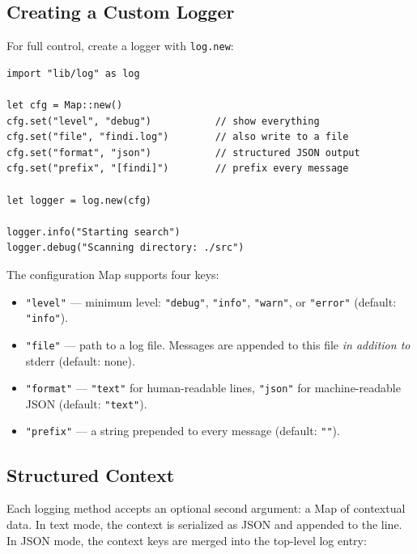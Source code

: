 \subsection{Creating a Custom Logger}\label{sec:log-custom-logger}


For full control, create a logger with \lstinline|log.new|:

\begin{lstlisting}[language=Lattice, caption={Creating a custom logger}]
import "lib/log" as log

let cfg = Map::new()
cfg.set("level", "debug")           // show everything
cfg.set("file", "findi.log")        // also write to a file
cfg.set("format", "json")           // structured JSON output
cfg.set("prefix", "[findi]")        // prefix every message

let logger = log.new(cfg)

logger.info("Starting search")
logger.debug("Scanning directory: ./src")
\end{lstlisting}

The configuration Map supports four keys:

\begin{itemize}
  \item \lstinline|"level"| --- minimum level: \lstinline|"debug"|, \lstinline|"info"|, \lstinline|"warn"|, or \lstinline|"error"| (default: \lstinline|"info"|).
  \item \lstinline|"file"| --- path to a log file. Messages are appended to this file \emph{in addition to} stderr (default: none).
  \item \lstinline|"format"| --- \lstinline|"text"| for human-readable lines, \lstinline|"json"| for machine-readable JSON (default: \lstinline|"text"|).
  \item \lstinline|"prefix"| --- a string prepended to every message (default: \lstinline|""|).
\end{itemize}

\subsection{Structured Context}\label{sec:log-context}


Each logging method accepts an optional second argument: a Map of contextual data.
In text mode, the context is serialized as JSON and appended to the line.
In JSON mode, the context keys are merged into the top-level log entry:

